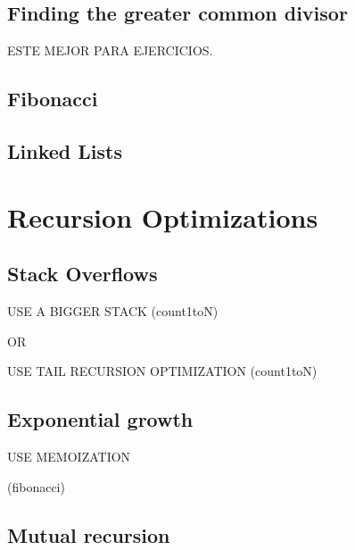 \documentclass[a4paper, 9pt]{extarticle}
\begin{document}
\subsection{Finding the greater common divisor}

ESTE MEJOR PARA EJERCICIOS.


\subsection{Fibonacci}


\subsection{Linked Lists}


\section{Recursion Optimizations}



\subsection{Stack Overflows}

USE A BIGGER STACK (count1toN)

OR

USE TAIL RECURSION OPTIMIZATION (count1toN)

\subsection{Exponential growth}

USE MEMOIZATION

(fibonacci)




\subsection{Mutual recursion}
\end{document}
